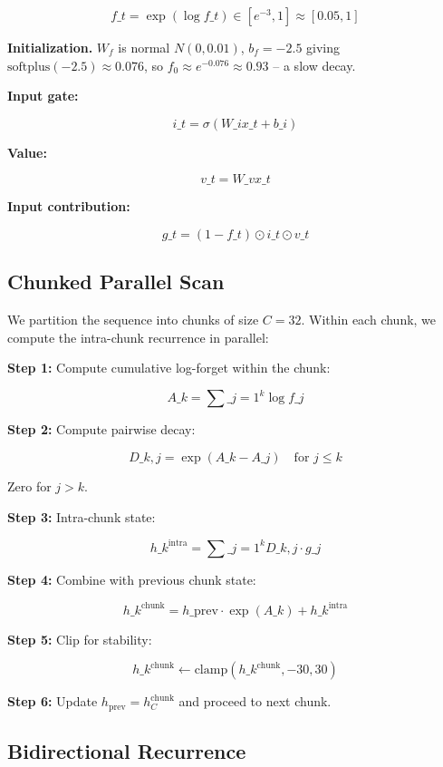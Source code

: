 \[
f\_t = \exp(\log f\_t) \in [e^{-3}, 1] \approx [0.05, 1]
\tag{4.3}
\]

\textbf{Initialization.} $W_f$ is normal $N(0, 0.01)$, $b_f = -2.5$ giving 
$\text{softplus}(-2.5) \approx 0.076$, so $f_0 \approx e^{-0.076} \approx 0.93$ 
-- a slow decay.

\textbf{Input gate:}

\[
i\_t = \sigma(W\_i x\_t + b\_i)
\tag{4.4}
\]

\textbf{Value:}

\[
v\_t = W\_v x\_t
\tag{4.5}
\]

\textbf{Input contribution:}

\[
g\_t = (1 - f\_t) \odot i\_t \odot v\_t
\tag{4.6}
\]

\subsection{Chunked Parallel Scan}

We partition the sequence into chunks of size $C = 32$. Within each chunk, 
we compute the intra-chunk recurrence in parallel:

\textbf{Step 1:} Compute cumulative log-forget within the chunk:

\[
A\_k = \sum\_{j=1}^{k} \log f\_j
\tag{4.7}
\]

\textbf{Step 2:} Compute pairwise decay:

\[
D\_{k,j} = \exp(A\_k - A\_j) \quad \text{for } j \leq k
\tag{4.8}
\]

Zero for $j > k$.

\textbf{Step 3:} Intra-chunk state:

\[
h\_k^\text{intra} = \sum\_{j=1}^{k} D\_{k,j} \cdot g\_j
\tag{4.9}
\]

\textbf{Step 4:} Combine with previous chunk state:

\[
h\_k^\text{chunk} = h\_\text{prev} \cdot \exp(A\_k) + h\_k^\text{intra}
\tag{4.10}
\]

\textbf{Step 5:} Clip for stability:

\[
h\_k^\text{chunk} \leftarrow \text{clamp}(h\_k^\text{chunk}, -30, 30)
\tag{4.11}
\]

\textbf{Step 6:} Update $h_\text{prev} = h_C^\text{chunk}$ and proceed to next chunk.

\subsection{Bidirectional Recurrence}

